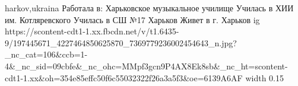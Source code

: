  
 
 
 
 

\par
harkov,ukraina
Работала в: Харьковское музыкальное училище
Училась в ХИИ им. Котляревского
Училась в СШ №17 Харьков
Живет в г. Харьков
\ifcmt
  ig https://scontent-cdt1-1.xx.fbcdn.net/v/t1.6435-9/197445671_4227464850625870_7369779236002454643_n.jpg?_nc_cat=106&ccb=1-4&_nc_sid=09cbfe&_nc_ohc=MMpf3gcn9P4AX8Ek8sb&_nc_ht=scontent-cdt1-1.xx&oh=354e85effc50f6c55032322f26a3a5f3&oe=6139A6AF
  width 0.15
\fi

